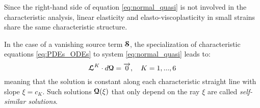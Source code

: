 \begin{remark}
  Since the right-hand side of equation \eqref{eq:normal_quasi} is not involved in the characteristic analysis, linear elasticity and elasto-viscoplasticity in small strains share the same characteristic structure. 
\end{remark}

\begin{remark}
  \label{rq:similarity_solution}
  In the case of a vanishing source term ${\boldsymbol{\mathcal{S}}}$, the specialization of characteristic equations \eqref{eq:PDEs_ODEs} to system \eqref{eq:normal_quasi} leads to:
\begin{equation}
  \label{eq:characteristic_equations_homogeneous}
  {\boldsymbol{\mathcal{L}}}^K \cdot d{\boldsymbol{\mathcal{Q}}} = {\overrightarrow{0}},\quad K=1,...,6
\end{equation}
meaning that the solution is constant along each characteristic straight line with slope $\xi = c_K$. Such solutions ${\boldsymbol{\mathcal{Q}}}(\xi)$ that only depend on the ray $\xi$ are called \textit{self-similar solutions}.
\end{remark}







